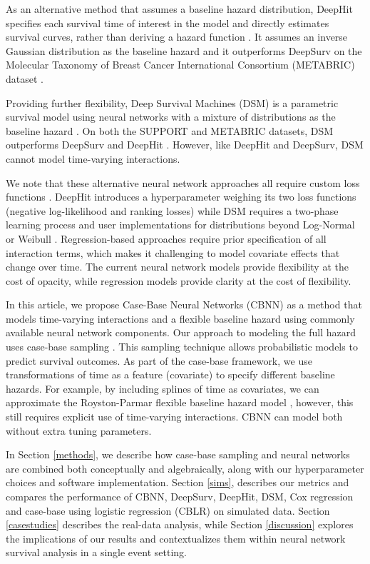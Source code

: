 \documentclass[APA,LATO1COL]{WileyNJD-v2}
\begin{document}
As an alternative method that assumes a baseline hazard distribution,
DeepHit specifies each survival time of interest in the model and
directly estimates survival curves, rather than deriving a hazard
function \citep{lee2018DeepHit}. It assumes an inverse Gaussian
distribution as the baseline hazard and it outperforms DeepSurv on the
Molecular Taxonomy of Breast Cancer International Consortium (METABRIC)
dataset \citep{curtis2012genomic}.

Providing further flexibility, Deep Survival Machines (DSM) is a
parametric survival model using neural networks with a mixture of
distributions as the baseline hazard \citep{dsmPaper}. On both the
SUPPORT and METABRIC datasets, DSM outperforms DeepSurv and DeepHit
\citep{dsmPaper}. However, like DeepHit and DeepSurv, DSM cannot model
time-varying interactions.

We note that these alternative neural network approaches all require
custom loss functions \citep{katzman2018DeepSurv} \citep{lee2018DeepHit}
\citep{dsmPaper}. DeepHit introduces a hyperparameter weighing its two
loss functions (negative log-likelihood and ranking losses) while DSM
requires a two-phase learning process and user implementations for
distributions beyond Log-Normal or Weibull \citep{lee2018DeepHit}
\citep{dsmPaper}. Regression-based approaches require prior
specification of all interaction terms, which makes it challenging to
model covariate effects that change over time. The current neural
network models provide flexibility at the cost of opacity, while
regression models provide clarity at the cost of flexibility.

In this article, we propose Case-Base Neural Networks (CBNN) as a method
that models time-varying interactions and a flexible baseline hazard
using commonly available neural network components. Our approach to
modeling the full hazard uses case-base sampling \citep{hanley2009}.
This sampling technique allows probabilistic models to predict survival
outcomes. As part of the case-base framework, we use transformations of
time as a feature (covariate) to specify different baseline hazards. For
example, by including splines of time as covariates, we can approximate
the Royston-Parmar flexible baseline hazard model
\citep{royston2002flexible}, however, this still requires explicit use
of time-varying interactions. CBNN can model both without extra tuning
parameters.

In Section \ref{methods}, we describe how case-base sampling and neural
networks are combined both conceptually and algebraically, along with
our hyperparameter choices and software implementation. Section
\ref{sims}, describes our metrics and compares the performance of CBNN,
DeepSurv, DeepHit, DSM, Cox regression and case-base using logistic
regression (CBLR) on simulated data. Section \ref{casestudies} describes
the real-data analysis, while Section \ref{discussion} explores the
implications of our results and contextualizes them within neural
network survival analysis in a single event setting.
\end{document}
